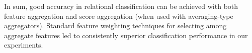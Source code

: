 \documentclass[conference]{IEEEtran}
\begin{document}
In sum, good accuracy in relational classification can be achieved with both feature aggregation and score aggregation (when used with averaging-type aggregators). Standard feature weighting techniques for selecting among aggregate features led to consistently superior classification performance in our experiments.













%
%
%






\end{document}
